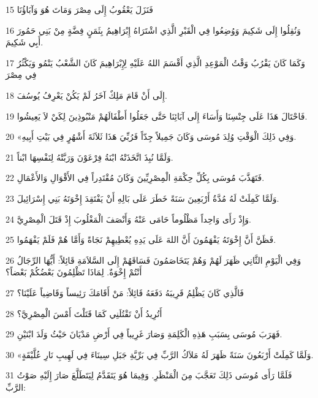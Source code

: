 \par 15 فَنَزَلَ يَعْقُوبُ إِلَى مِصْرَ وَمَاتَ هُوَ وَآبَاؤُنَا
\par 16 وَنُقِلُوا إِلَى شَكِيمَ وَوُضِعُوا فِي الْقَبْرِ الَّذِي اشْتَرَاهُ إِبْرَاهِيمُ بِثَمَنٍ فِضَّةٍ مِنْ بَنِي حَمُورَ أَبِي شَكِيمَ.
\par 17 وَكَمَا كَانَ يَقْرُبُ وَقْتُ الْمَوْعِدِ الَّذِي أَقْسَمَ اللهُ عَلَيْهِ لِإِبْرَاهِيمَ كَانَ الشَّعْبُ يَنْمُو وَيَكْثُرُ فِي مِصْرَ
\par 18 إِلَى أَنْ قَامَ مَلِكٌ آخَرُ لَمْ يَكُنْ يَعْرِفُ يُوسُفَ.
\par 19 فَاحْتَالَ هَذَا عَلَى جِنْسِنَا وَأَسَاءَ إِلَى آبَائِنَا حَتَّى جَعَلُوا أَطْفَالَهُمْ مَنْبُوذِينَ لِكَيْ لاَ يَعِيشُوا.
\par 20 «وَفِي ذَلِكَ الْوَقْتِ وُلِدَ مُوسَى وَكَانَ جَمِيلاً جِدّاً فَرُبِّيَ هَذَا ثَلاَثَةَ أَشْهُرٍ فِي بَيْتِ أَبِيهِ.
\par 21 وَلَمَّا نُبِذَ اتَّخَذَتْهُ ابْنَةُ فِرْعَوْنَ وَرَبَّتْهُ لِنَفْسِهَا ابْناً.
\par 22 فَتَهَذَّبَ مُوسَى بِكُلِّ حِكْمَةِ الْمِصْرِيِّينَ وَكَانَ مُقْتَدِراً فِي الأَقْوَالِ وَالأَعْمَالِ.
\par 23 وَلَمَّا كَمِلَتْ لَهُ مُدَّةُ أَرْبَعِينَ سَنَةً خَطَرَ عَلَى بَالِهِ أَنْ يَفْتَقِدَ إِخْوَتَهُ بَنِي إِسْرَائِيلَ.
\par 24 وَإِذْ رَأَى وَاحِداً مَظْلُوماً حَامَى عَنْهُ وَأَنْصَفَ الْمَغْلُوبَ إِذْ قَتَلَ الْمِصْرِيَّ.
\par 25 فَظَنَّ أَنَّ إِخْوَتَهُ يَفْهَمُونَ أَنَّ اللهَ عَلَى يَدِهِ يُعْطِيهِمْ نَجَاةً وَأَمَّا هُمْ فَلَمْ يَفْهَمُوا.
\par 26 وَفِي الْيَوْمِ الثَّانِي ظَهَرَ لَهُمْ وَهُمْ يَتَخَاصَمُونَ فَسَاقَهُمْ إِلَى السَّلاَمَةِ قَائِلاً: أَيُّهَا الرِّجَالُ أَنْتُمْ إِخْوَةٌ. لِمَاذَا تَظْلِمُونَ بَعْضُكُمْ بَعْضاً؟
\par 27 فَالَّذِي كَانَ يَظْلِمُ قَرِيبَهُ دَفَعَهُ قَائِلاً: مَنْ أَقَامَكَ رَئِيساً وَقَاضِياً عَلَيْنَا؟
\par 28 أَتُرِيدُ أَنْ تَقْتُلَنِي كَمَا قَتَلْتَ أَمْسَ الْمِصْرِيَّ؟
\par 29 فَهَرَبَ مُوسَى بِسَبَبِ هَذِهِ الْكَلِمَةِ وَصَارَ غَرِيباً فِي أَرْضِ مَدْيَانَ حَيْثُ وَلَدَ ابْنَيْنِ.
\par 30 «وَلَمَّا كَمِلَتْ أَرْبَعُونَ سَنَةً ظَهَرَ لَهُ مَلاَكُ الرَّبِّ فِي بَرِّيَّةِ جَبَلِ سِينَاءَ فِي لَهِيبِ نَارِ عُلَّيْقَةٍ.
\par 31 فَلَمَّا رَأَى مُوسَى ذَلِكَ تَعَجَّبَ مِنَ الْمَنْظَرِ. وَفِيمَا هُوَ يَتَقَدَّمُ لِيَتَطَلَّعَ صَارَ إِلَيْهِ صَوْتُ الرَّبِّ:
